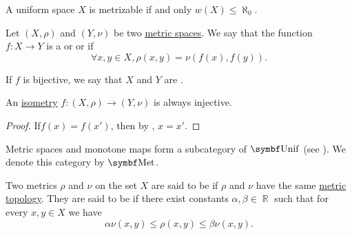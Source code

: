 \begin{theorem}\label{thm:countable_uniform_base_implies_metrizable}
  A uniform space \( X \) is metrizable if and only \( w(X) \leq \aleph_0 \).
\end{theorem}

\medskip

\begin{definition}\label{def:isometry}
  Let \( (X, \rho) \) and \( (Y, \nu) \) be two \hyperref[def:metric_space]{metric spaces}. We say that the function \( f: X \to Y \) is a  or  or  if
  \begin{equation*}
    \forall x, y \in X, \rho(x, y) = \nu(f(x), f(y)).
  \end{equation*}

  If \( f \) is bijective, we say that \( X \) and \( Y \) are .
\end{definition}

\begin{proposition}\label{thm:isometry_is_injective}
  An \hyperref[def:isometry]{isometry} \( f: (X, \rho) \to (Y, \nu) \) is always injective.
\end{proposition}
\begin{proof}
  If\LEM \( f(x) = f(x') \), then by , \( x = x' \).
\end{proof}

\begin{definition}\label{def:category_of_metric_spaces}
  Metric spaces and monotone maps form a subcategory of \( \Cat{Unif} \) (see ). We denote this category by \( \Cat{Met} \).
\end{definition}

\begin{definition}\label{def:equivalent_metrics}
  Two metrics \( \rho \) and \( \nu \) on the set \( X \) are said to be  if \( \rho \) and \( \nu \) have the same \hyperref[def:metric_topology]{metric topology}. They are said to be  if there exist constants \( \alpha, \beta \in \BbbR \) such that for every \( x, y \in X \) we have
  \begin{equation*}
    \alpha \nu(x, y) \leq \rho(x, y) \leq \beta \nu(x, y).
  \end{equation*}
\end{definition}

